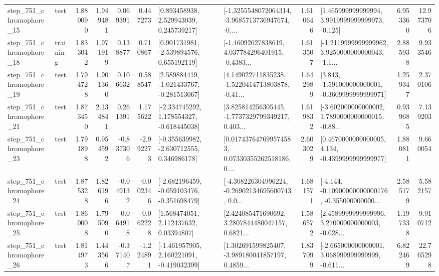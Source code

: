 \begin{tabular}{llrrrrllrlrr}
  step\_751\_chromophore\_15 &      test &      1.880090 &    1.949481 &      0.069391 &  0.447273 &     [0.893458938, 2.529943039, 0.245739217] &  [-1.3255548072064314, -3.9685713736947674, -0.... &       1.610646 &    [1.465999999999994, 3.9919999999999973, -0.125] &            6.953360 &         12.973706 \\
  step\_751\_chromophore\_18 &  training &      1.833042 &    1.971919 &      0.138877 &  0.710867 &    [0.901731981, -2.539894576, 0.655192119] &  [-1.46092627838619, 4.037784296401915, -0.4383... &       1.613507 &  [-1.2119999999999962, 3.9250000000000043, -1.1... &            2.885938 &          9.933546 \\
  step\_751\_chromophore\_19 &      test &      1.794728 &    1.901360 &      0.106632 &  0.588547 &   [2.589884419, -1.021433767, -0.281513067] &  [4.149022711835238, -1.5220414713803878, -0.41... &       1.642989 &   [3.843, -1.591000000000001, -0.3609999999999971] &            1.259347 &          2.370106 \\
  step\_751\_chromophore\_21 &      test &      1.873450 &    2.134841 &      0.261391 &  1.175622 &   [-2.334745292, 1.178554327, -0.618445038] &  [3.825814256305445, -1.7737329799349217, 0.403... &       1.619832 &  [-3.602000000000002, 1.7890000000000015, -0.88... &            0.939685 &          7.139203 \\
  step\_751\_chromophore\_23 &      test &      1.791898 &    0.954592 &     -0.837306 & -2.992273 &   [-0.355639982, -2.630712555, 0.346986178] &  [0.017437647699574583, 0.07330355262518186, 0.... &       2.603029 &   [0.4670000000000005, 4.134, -0.4399999999999977] &            1.880811 &          9.660054 \\
  step\_751\_chromophore\_24 &      test &      1.875328 &    1.826196 &     -0.049132 & -0.002346 &  [-2.682196459, -0.059103476, -0.351698479] &  [-4.308226304996224, -0.26902134695600743, 0.0... &       1.681571 &  [-4.144, -0.10900000000000176, -0.355000000000... &            2.585179 &          5.582157 \\
  step\_751\_chromophore\_25 &      test &      1.860008 &    1.795090 &     -0.064918 & -0.062228 &      [1.568474051, 2.112437632, 0.03394807] &  [2.424085471690692, 3.2807844480047157, 0.6821... &       1.586572 &  [2.4589999999999996, 3.270000000000003, -0.028... &            1.197338 &          9.910712 \\
  step\_751\_chromophore\_26 &      test &      1.814973 &    1.443566 &     -0.371407 & -1.224891 &   [-1.461957905, 2.160221091, -0.419032399] &  [1.302691599825407, -3.989180041857197, 0.4859... &       1.837099 &  [-2.665000000000001, 3.068999999999999, -0.611... &            6.822469 &         22.765298 \\

\end{tabular}
